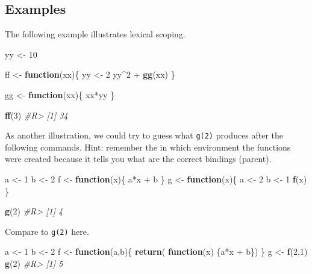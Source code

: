 \documentclass[]{book}
\newenvironment{Shaded}{}{}
\newcommand{\CommentTok}[1]{\textcolor[rgb]{0.38,0.63,0.69}{\textit{#1}}}
\newcommand{\ControlFlowTok}[1]{\textcolor[rgb]{0.00,0.44,0.13}{\textbf{#1}}}
\newcommand{\DecValTok}[1]{\textcolor[rgb]{0.25,0.63,0.44}{#1}}
\newcommand{\KeywordTok}[1]{\textcolor[rgb]{0.00,0.44,0.13}{\textbf{#1}}}
\newcommand{\NormalTok}[1]{#1}
\newcommand{\OperatorTok}[1]{\textcolor[rgb]{0.40,0.40,0.40}{#1}}
\newcommand{\StringTok}[1]{\textcolor[rgb]{0.25,0.44,0.63}{#1}}
\theoremstyle{definition}
\theoremstyle{definition}
\theoremstyle{definition}
\theoremstyle{remark}
\begin{document}
\hypertarget{examples}{%
\subsection{Examples}\label{examples}}

The following example illustrates lexical scoping.

\begin{Shaded}
\begin{Highlighting}[]
\NormalTok{yy <-}\StringTok{ }\DecValTok{10}

\NormalTok{ff <-}\StringTok{ }\ControlFlowTok{function}\NormalTok{(xx)\{}
\NormalTok{  yy <-}\StringTok{ }\DecValTok{2}
\NormalTok{  yy}\OperatorTok{^}\DecValTok{2} \OperatorTok{+}\StringTok{ }\KeywordTok{gg}\NormalTok{(xx)}
\NormalTok{\}}

\NormalTok{gg <-}\StringTok{ }\ControlFlowTok{function}\NormalTok{(xx)\{}
\NormalTok{  xx}\OperatorTok{*}\NormalTok{yy}
\NormalTok{\}}

\KeywordTok{ff}\NormalTok{(}\DecValTok{3}\NormalTok{) }
\CommentTok{#R> [1] 34}
\end{Highlighting}
\end{Shaded}

As another illustration, we could try to guess what \texttt{g(2)}
produces after the following commands. Hint: remember the in which
environment the functions were created because it tells you what are the
correct bindings (parent).

\begin{Shaded}
\begin{Highlighting}[]
\NormalTok{a <-}\StringTok{ }\DecValTok{1}
\NormalTok{b <-}\StringTok{ }\DecValTok{2}
\NormalTok{f <-}\StringTok{ }\ControlFlowTok{function}\NormalTok{(x)\{}
\NormalTok{  a}\OperatorTok{*}\NormalTok{x }\OperatorTok{+}\StringTok{ }\NormalTok{b}
\NormalTok{\}}
\NormalTok{g <-}\StringTok{ }\ControlFlowTok{function}\NormalTok{(x)\{}
\NormalTok{  a <-}\StringTok{ }\DecValTok{2}
\NormalTok{  b <-}\StringTok{ }\DecValTok{1}
  \KeywordTok{f}\NormalTok{(x)}
\NormalTok{\}}

\KeywordTok{g}\NormalTok{(}\DecValTok{2}\NormalTok{)}
\CommentTok{#R> [1] 4}
\end{Highlighting}
\end{Shaded}

Compare to \texttt{g(2)} here.

\begin{Shaded}
\begin{Highlighting}[]
\NormalTok{a <-}\StringTok{ }\DecValTok{1}
\NormalTok{b <-}\StringTok{ }\DecValTok{2}
\NormalTok{f <-}\StringTok{ }\ControlFlowTok{function}\NormalTok{(a,b)\{}
  \KeywordTok{return}\NormalTok{( }\ControlFlowTok{function}\NormalTok{(x) \{a}\OperatorTok{*}\NormalTok{x }\OperatorTok{+}\StringTok{ }\NormalTok{b\})}
\NormalTok{\}}
\NormalTok{g <-}\StringTok{ }\KeywordTok{f}\NormalTok{(}\DecValTok{2}\NormalTok{,}\DecValTok{1}\NormalTok{)}
\KeywordTok{g}\NormalTok{(}\DecValTok{2}\NormalTok{)}
\CommentTok{#R> [1] 5}
\end{Highlighting}
\end{Shaded}
\end{document}
